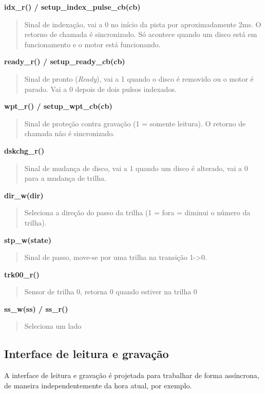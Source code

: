 \documentclass[letterpaper,10pt,brazil]{sphinxmanual}
\begin{document}
\textbf{idx\_r() / setup\_index\_pulse\_cb(cb)}
\begin{quote}

Sinal de indexação, vai a 0 no início da pista por aproximadamente
2ms. O retorno de chamada é sincronizado. Só acontece quando um disco
está em funcionamento e o motor está funcionando.
\end{quote}

\textbf{ready\_r() / setup\_ready\_cb(cb)}
\begin{quote}

Sinal de pronto (\emph{Ready}), vai a 1 quando o disco é removido ou o motor
é parado. Vai a 0 depois de dois pulsos indexados.
\end{quote}

\textbf{wpt\_r() / setup\_wpt\_cb(cb)}
\begin{quote}

Sinal de proteção contra gravação (1 = somente leitura).
O retorno de chamada não é sincronizado.
\end{quote}

\textbf{dskchg\_r()}
\begin{quote}

Sinal de mudança de disco, vai a 1 quando um disco é alterado, vai a 0
para a mudança de trilha.
\end{quote}

\textbf{dir\_w(dir)}
\begin{quote}

Seleciona a direção do passo da trilha (1 = fora = diminui o número da
trilha).
\end{quote}

\textbf{stp\_w(state)}
\begin{quote}

Sinal de passo, move-se por uma trilha na transição 1-\textgreater{}0.
\end{quote}

\textbf{trk00\_r()}
\begin{quote}

Sensor de trilha 0, retorna 0 quando estiver na trilha 0
\end{quote}

\textbf{ss\_w(ss) / ss\_r()}
\begin{quote}

Seleciona um lado
\end{quote}


\subsection{Interface de leitura e gravação}
\label{techspecs/floppy:interface-de-leitura-e-gravacao}
A interface de leitura e gravação é projetada para trabalhar de forma
assíncrona, de maneira independentemente da hora atual, por exemplo.
\clearpage
\end{document}
